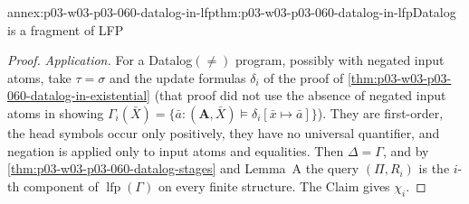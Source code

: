 \begin{annexitem}{annex:p03-w03-p03-060-datalog-in-lfp}{thm:p03-w03-p03-060-datalog-in-lfp}{Datalog is a fragment of LFP}
\begin{proof}
\emph{Application.} For a Datalog\((\neq)\) program, possibly with negated
input atoms, take \(\tau=\sigma\) and the update formulas \(\delta_i\) of
the proof of \cref{thm:p03-w03-p03-060-datalog-in-existential} (that proof
did not use the absence of negated input atoms in showing
\(\Gamma_i(\bar X)=\{\bar a:(\mathbf A,\bar X)\models\delta_i[\bar x\mapsto\bar a]\}\)).
They are first-order, the head symbols occur only positively, they have no
universal quantifier, and negation is applied only to input atoms and
equalities. Then \(\Delta=\Gamma\), and by
\cref{thm:p03-w03-p03-060-datalog-stages} and Lemma~A the query
\((\Pi,R_i)\) is the \(i\)-th component of \(\operatorname{lfp}(\Gamma)\)
on every finite structure. The Claim gives \(\chi_i\).
\end{proof}
\end{annexitem}

